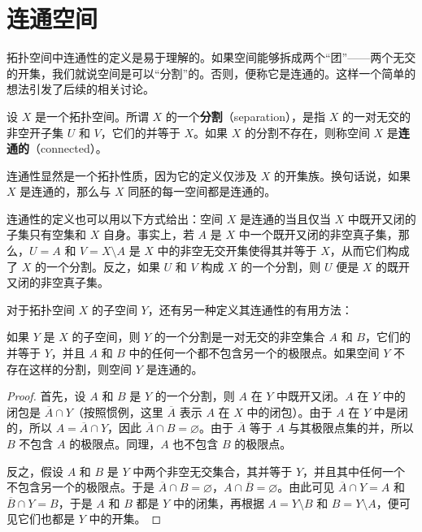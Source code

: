 \documentclass[../../main.tex]{subfiles}
\begin{document}
\section{连通空间}\label{section:ch03-connected-spaces}

拓扑空间中连通性的定义是易于理解的。如果空间能够拆成两个``团''——两个无交的开集，我们就说空间是可以``分割''的。否则，便称它是连通的。这样一个简单的想法引发了后续的相关讨论。

\begin{definition}\label{definition:ch03-separation}
设 $X$ 是一个拓扑空间。所谓 $X$ 的一个\textbf{分割}（separation），是指 $X$ 的一对无交的非空开子集 $U$ 和 $V$，它们的并等于 $X$。如果 $X$ 的分割不存在，则称空间 $X$ 是\textbf{连通的}（connected）。
\end{definition}

连通性显然是一个拓扑性质，因为它的定义仅涉及 $X$ 的开集族。换句话说，如果 $X$ 是连通的，那么与 $X$ 同胚的每一空间都是连通的。

连通性的定义也可以用以下方式给出：空间 $X$ 是连通的当且仅当 $X$ 中既开又闭的子集只有空集和 $X$ 自身。事实上，若 $A$ 是 $X$ 中一个既开又闭的非空真子集，那么，$U=A$ 和 $V=X\setminus A$ 是 $X$ 中的非空无交开集使得其并等于 $X$，从而它们构成了 $X$ 的一个分割。反之，如果 $U$ 和 $V$ 构成 $X$ 的一个分割，则 $U$ 便是 $X$ 的既开又闭的非空真子集。

对于拓扑空间 $X$ 的子空间 $Y$，还有另一种定义其连通性的有用方法：

\begin{lemma}\label{lemma:ch03-subspace-separation}
如果 $Y$ 是 $X$ 的子空间，则 $Y$ 的一个分割是一对无交的非空集合 $A$ 和 $B$，它们的并等于 $Y$，并且 $A$ 和 $B$ 中的任何一个都不包含另一个的极限点。如果空间 $Y$ 不存在这样的分割，则空间 $Y$ 是连通的。
\end{lemma}

\begin{proof}
首先，设 $A$ 和 $B$ 是 $Y$ 的一个分割，则 $A$ 在 $Y$ 中既开又闭。$A$ 在 $Y$ 中的闭包是 $\overline{A}\cap Y$（按照惯例，这里 $\overline{A}$ 表示 $A$ 在 $X$ 中的闭包）。由于 $A$ 在 $Y$ 中是闭的，所以 $A=\overline{A}\cap Y$，因此 $\overline{A}\cap B=\varnothing$。由于 $\overline{A}$ 等于 $A$ 与其极限点集的并，所以 $B$ 不包含 $A$ 的极限点。同理，$A$ 也不包含 $B$ 的极限点。

反之，假设 $A$ 和 $B$ 是 $Y$ 中两个非空无交集合，其并等于 $Y$，并且其中任何一个不包含另一个的极限点。于是 $\overline{A}\cap B=\varnothing$，$A\cap\overline{B}=\varnothing$。由此可见 $\overline{A}\cap Y=A$ 和 $\overline{B}\cap Y=B$，于是 $A$ 和 $B$ 都是 $Y$ 中的闭集，再根据 $A=Y\setminus B$ 和 $B=Y\setminus A$，便可见它们也都是 $Y$ 中的开集。
\end{proof}
\end{document}
